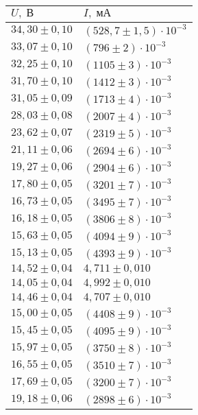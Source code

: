 \begin{tabular}{|l|l|}
\hline
$U,\;\text{В}$ & $I,\;\text{мА}$\\\hline
$34{,}30 \pm 0{,}10$ & $\left(528{,}7 \pm 1{,}5\right)\cdot 10^{-3}$\\\hline
$33{,}07 \pm 0{,}10$ & $\left(796 \pm 2\right)\cdot 10^{-3}$\\\hline
$32{,}25 \pm 0{,}10$ & $\left(1105 \pm 3\right)\cdot 10^{-3}$\\\hline
$31{,}70 \pm 0{,}10$ & $\left(1412 \pm 3\right)\cdot 10^{-3}$\\\hline
$31{,}05 \pm 0{,}09$ & $\left(1713 \pm 4\right)\cdot 10^{-3}$\\\hline
$28{,}03 \pm 0{,}08$ & $\left(2007 \pm 4\right)\cdot 10^{-3}$\\\hline
$23{,}62 \pm 0{,}07$ & $\left(2319 \pm 5\right)\cdot 10^{-3}$\\\hline
$21{,}11 \pm 0{,}06$ & $\left(2694 \pm 6\right)\cdot 10^{-3}$\\\hline
$19{,}27 \pm 0{,}06$ & $\left(2904 \pm 6\right)\cdot 10^{-3}$\\\hline
$17{,}80 \pm 0{,}05$ & $\left(3201 \pm 7\right)\cdot 10^{-3}$\\\hline
$16{,}73 \pm 0{,}05$ & $\left(3495 \pm 7\right)\cdot 10^{-3}$\\\hline
$16{,}18 \pm 0{,}05$ & $\left(3806 \pm 8\right)\cdot 10^{-3}$\\\hline
$15{,}63 \pm 0{,}05$ & $\left(4094 \pm 9\right)\cdot 10^{-3}$\\\hline
$15{,}13 \pm 0{,}05$ & $\left(4393 \pm 9\right)\cdot 10^{-3}$\\\hline
$14{,}52 \pm 0{,}04$ & $4{,}711 \pm 0{,}010$\\\hline
$14{,}05 \pm 0{,}04$ & $4{,}992 \pm 0{,}010$\\\hline
$14{,}46 \pm 0{,}04$ & $4{,}707 \pm 0{,}010$\\\hline
$15{,}00 \pm 0{,}05$ & $\left(4408 \pm 9\right)\cdot 10^{-3}$\\\hline
$15{,}45 \pm 0{,}05$ & $\left(4095 \pm 9\right)\cdot 10^{-3}$\\\hline
$15{,}97 \pm 0{,}05$ & $\left(3750 \pm 8\right)\cdot 10^{-3}$\\\hline
$16{,}55 \pm 0{,}05$ & $\left(3510 \pm 7\right)\cdot 10^{-3}$\\\hline
$17{,}69 \pm 0{,}05$ & $\left(3200 \pm 7\right)\cdot 10^{-3}$\\\hline
$19{,}18 \pm 0{,}06$ & $\left(2898 \pm 6\right)\cdot 10^{-3}$\\\hline

\end{tabular}
